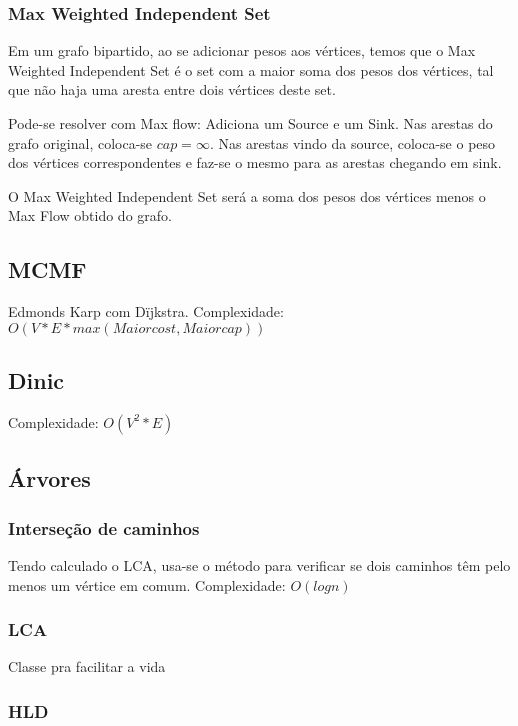 \subsubsection{Max Weighted Independent Set}
Em um grafo bipartido, ao se adicionar pesos aos v\'{e}rtices, temos que o Max Weighted Independent Set \'{e} o set com a maior soma dos pesos dos v\'{e}rtices, tal que n\~{a}o haja uma aresta entre dois v\'{e}rtices deste set.

Pode-se resolver com Max flow: Adiciona um Source e um Sink. Nas arestas do grafo original, coloca-se $cap=\infty$. Nas arestas vindo da source, coloca-se o peso dos v\'{e}rtices correspondentes e faz-se o mesmo para as arestas chegando em sink.

O Max Weighted Independent Set ser\'{a} a soma dos pesos dos v\'{e}rtices menos o Max Flow obtido do grafo.
\divisor

\subsection{MCMF}
Edmonds Karp com D\"{i}jkstra. Complexidade: $O(V*E*max(Maior cost,Maior cap))$
\divisor

\subsection{Dinic}
Complexidade: $O(V^2*E)$
\divisor

\subsection{\'{A}rvores}
\subsubsection{Interse\c{c}\~{a}o de caminhos}
Tendo calculado o LCA, usa-se o m\'{e}todo para verificar se dois caminhos t\^{e}m pelo menos um v\'{e}rtice em comum. Complexidade: $O(log n)$
\divisor
\subsubsection{LCA}
Classe pra facilitar a vida
\divisor
\subsubsection{HLD}
\divisor
